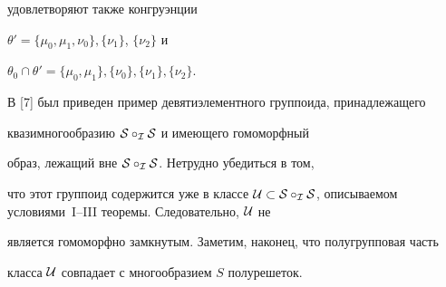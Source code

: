 удовлетворяют также конгруэнции


$\theta'=\{\mu_0,\mu_1,\nu_0\},\{\nu_1\}$, $\{\nu_2\}$ и


$\theta_0\cap\theta'=\{\mu_0,\mu_1\},\{\nu_0\},\{\nu_1\},\{\nu_2\}$.





В [7] был приведен пример девятиэлементного группоида, принадлежащего


квазимногообразию $\cal S\circ_{\cal I}\cal S$ и имеющего гомоморфный


образ, лежащий вне $\cal S\circ_{\cal I}\cal S$. Нетрудно убедиться в том,


что этот группоид содержится уже в классе $\cal U\subset \cal S\circ_{\cal


I}\cal S$, описываемом условиями~I--III теоремы. Следовательно, $\cal U$ не


является гомоморфно замкнутым. Заметим, наконец, что полугрупповая часть


класса $\cal U$ совпадает с многообразием $S$ полурешеток.





